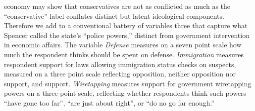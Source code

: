 \documentclass[12pt,]{article}
\begin{document}
economy may show that conservatives are not as conflicted as much as the
``conservative'' label conflates distinct but latent ideological
components. Therefore we add to a conventional battery of variables
three that capture what Spencer called the state's ``police powers,''
distinct from government intervention in economic affairs. The variable
\emph{Defense} measures on a seven point scale how much the respondent
thinks should be spent on defense. \emph{Immigration} measures
respondent support for laws allowing immigration status checks on
suspects, measured on a three point scale reflecting opposition, neither
opposition nor support, and support. \emph{Wiretapping} measures support
for government wiretapping powers on a three point scale, reflecting
whether respondents think such powers ``have gone too far'', ``are just
about right'', or ``do no go far enough.''
\end{document}
